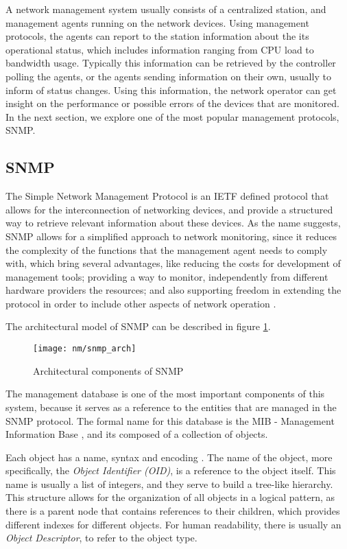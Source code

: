 \par A network management system usually consists of a centralized station, and management agents running on the network devices. Using management protocols, the
agents can report to the station information about the its operational status, which includes information ranging from CPU load to bandwidth usage. Typically this
information can be retrieved by the controller polling the agents, or the agents sending information on their own, usually to inform of status changes. Using this 
information, the network operator can get insight on the performance or possible errors of the devices that are monitored. In the next section, we explore one of the
most popular management protocols, SNMP.

\subsection {SNMP}

The Simple Network Management Protocol is an IETF defined protocol that allows for the interconnection of networking devices, and provide a structured way to
retrieve relevant information about these devices. As the name suggests, SNMP allows for a simplified approach to network monitoring, since it reduces the complexity
of the functions that the management agent needs to comply with, which bring several advantages, like reducing the costs for development of management tools;
providing a way to monitor, independently from different hardware providers the resources; and also supporting freedom in extending the protocol in order to include
other aspects of network operation \cite{fedor_simple_1990}.
\par The architectural model of SNMP can be described in figure \ref{fig:snmp}.
    
\begin{figure} [!htbp]
    \centering
    \texttt{[image: nm/snmp\_arch]}
    \caption{Architectural components of SNMP}
    \label{fig:snmp}
\end{figure}

The management database is one of the most important components of this system, because it serves as a reference to the entities that are managed in the SNMP
protocol. The formal name for this database is the MIB - Management Information Base \cite{rose_structure_1990}, and its composed of a collection of objects.

\par Each object has a name, syntax and encoding \cite{rose_management_1990}. The name of the object, more specifically, the \textit {Object Identifier (OID)}, is a
reference to the object itself. This name is usually a list of integers, and they serve to build a tree-like hierarchy. This structure allows for the organization 
of all objects in a logical pattern, as there is a parent node that contains references to their children, which provides different indexes for different objects. 
For human readability, there is usually an \textit {Object Descriptor}, to refer to the object type. 

